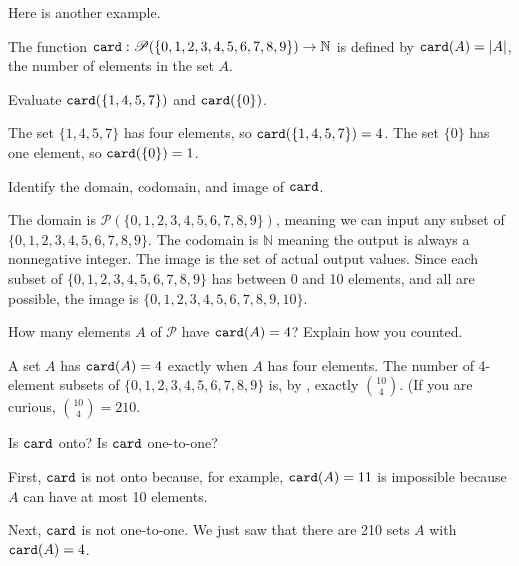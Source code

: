 Here is another example.

\begin{exam}
\label{exam_cardinality_fn_set}
    The function $\texttt{card}:\mathscr{P}(\{0,1,2,3,4,5,6,7,8,9\}) \to \mathbb{N}$ is defined by $\texttt{card}(A)=|A|$, the number of elements in the set $A$.
        \begin{apart}
            \item Evaluate $\texttt{card}(\{1,4,5,7\})$ and $\texttt{card}(\{0\})$.
                \begin{soln}
                    The set $\{1,4,5,7\}$ has four elements, so $\texttt{card}(\{1,4,5,7\})=4$.  The set $\{0\}$ has one element, so $\texttt{card}(\{0\})=1$.
                \end{soln}
            \item Identify the domain, codomain, and image of $\texttt{card}$.
                \begin{soln}
                    The domain is $\mathscr{P}(\{0,1,2,3,4,5,6,7,8,9\})$, meaning we can input any subset of $\{0,1,2,3,4,5,6,7,8,9\}$. The codomain is $\mathbb{N}$ meaning the output is always a nonnegative integer.  The image is the set of actual output values.  Since each subset of $\{0,1,2,3,4,5,6,7,8,9\}$ has between 0 and 10 elements, and all are possible, the image is $\{0,1,2,3,4,5,6,7,8,9,10\}$.
                \end{soln}
            \item How many elements $A$ of $\mathscr{P}$ have $\texttt{card}(A)=4$?  Explain how you counted.
                \begin{soln}
                    A set $A$ has $\texttt{card}(A)=4$ exactly when $A$ has four elements.  The number of 4-element subsets of $\{0,1,2,3,4,5,6,7,8,9\}$ is, by , exactly $\binom{10}{4}$.  (If you are curious, $\binom{10}{4}=210$.
                \end{soln}
            \item Is $\texttt{card}$ onto?  Is $\texttt{card}$ one-to-one?
                \begin{soln}
                    First, $\texttt{card}$ is not onto because, for example, $\texttt{card}(A)=11$ is impossible because $A$ can have at most 10 elements.

                    Next, $\texttt{card}$ is not one-to-one. We just saw that there are 210 sets $A$ with $\texttt{card}(A) = 4$.
                \end{soln}
        \end{apart}    
\end{exam}


